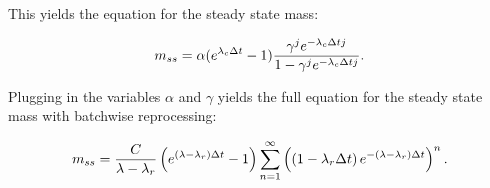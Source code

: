 This yields the equation for the steady state mass:

\begin{equation} \hfill
m_{ss} = \alpha (e^{\lambda_c \Delta t} - 1) \frac{\gamma^j e^{-\lambda_c \Delta t j}}{1 - \gamma^j e^{-\lambda_c \Delta t j}}.
\hfill \end{equation}

Plugging in the variables $\alpha$ and $\gamma$ yields the full equation for the steady state mass with batchwise reprocessing:

\begin{equation} \hfill 
m_{ss} =  \frac{C}{\lambda - \lambda_r} \left(e^{(\lambda - \lambda_r) \Delta t} - 1 \right) \sum_{n=1}^{\infty} \left( \left(1 - \lambda_r \Delta t \right) e^{-(\lambda - \lambda_r) \Delta t} \right)^n.
\hfill \end{equation}
